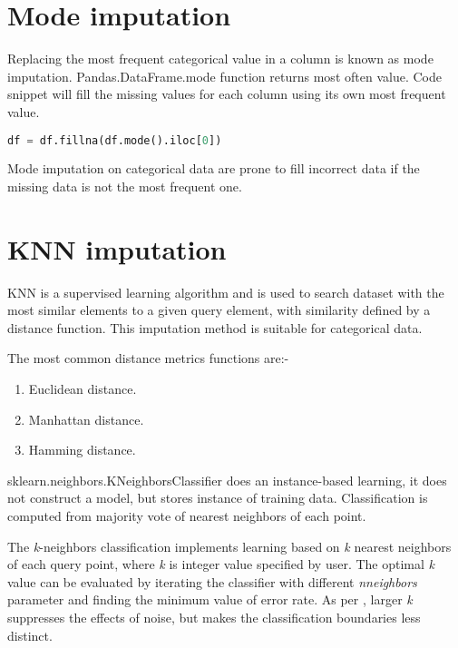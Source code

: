 \section{Mode imputation}

Replacing the most frequent categorical value in a column is known as mode imputation.  Pandas.DataFrame.mode \parencite{mckinney-proc-scipy-2010} function returns most often value. Code snippet will fill the missing values for each column using its own most frequent value.

\begin{lstlisting}[language=Python, caption={Pandas DataFrames mode function}]
    df = df.fillna(df.mode().iloc[0])
\end{lstlisting}

Mode imputation on categorical data are prone to fill incorrect data if the missing data is not the most frequent one.



\section{\acf{KNN}  imputation}

\acl{KNN} is a supervised learning algorithm and is used to search dataset with the most similar elements to a given query element, with similarity defined by a distance function. This imputation method is suitable for categorical data.

The most common distance metrics functions are:-

\begin{enumerate}
    \item Euclidean distance.
    \item Manhattan distance.
    \item Hamming distance.
\end{enumerate}

sklearn.neighbors.KNeighborsClassifier \parencite{scikit-learn} does an instance-based learning, it does not construct a model, but stores instance of training data. Classification is computed from majority vote of nearest neighbors of each point.

The \textit{k}-neighbors classification implements learning based on  \textit{k} nearest neighbors of each query point, where \textit{k} is integer value specified by user. The optimal \textit{k} value can be evaluated by iterating the classifier with different  \textit{n\textunderscore neighbors} parameter and finding the minimum value of error rate. As per \parencite{scikit-learn}, larger \textit{k} suppresses the effects of noise, but makes the classification boundaries less distinct.

